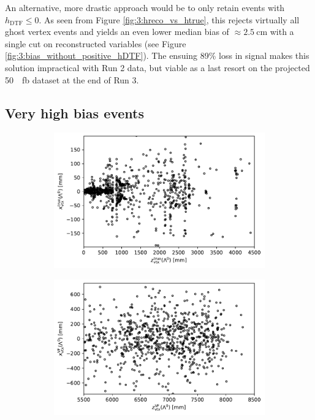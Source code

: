 An alternative, more drastic approach would be to only retain \lambdadecay events with $h_\text{DTF} \leq 0$. As seen from Figure \ref{fig:3:hreco_vs_htrue}, this rejects virtually all ghost vertex events and yields an even lower median bias of $\approx \SI{2.5}{\centi\meter}$ with a single cut on reconstructed variables (see Figure \ref{fig:3:bias_without_positive_hDTF}).
The ensuing 89\% loss in \demonstratorshort signal makes this solution impractical with Run 2 data, but viable as a last resort on the projected \SI{50}{\per\femto\barn} dataset at the end of Run 3.

\subsection{Very high bias events}

\begin{figure}[t]
	\centering
	\begin{subfigure}{.45\textwidth}
		\includegraphics[width=\textwidth]{graphics/03-vertex_reconstruction/bump_Lambda_true_endvertex_z_vs_x.pdf}
		\caption{}
		\label{fig:3:bump_true}
	\end{subfigure}
	\begin{subfigure}{.45\textwidth}
		\includegraphics[width=\textwidth]{graphics/03-vertex_reconstruction/bump_scatter_Lambda_endvertex_z_vs_x.pdf}

\end{subfigure}
\end{figure}
